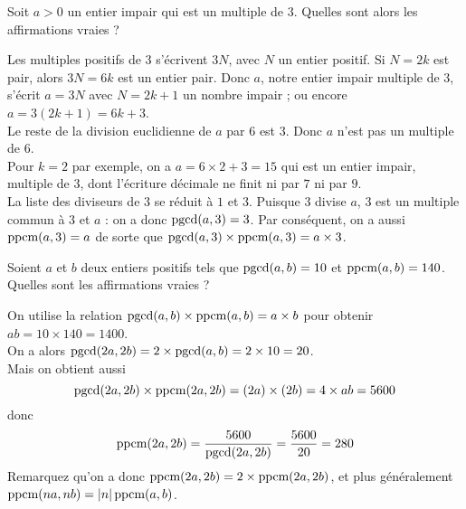 \begin{question}
    Soit $a>0$ un entier impair qui est un multiple de $3$. Quelles sont alors les affirmations vraies ?
    \begin{answers} 
    \end{answers}
    \begin{explanations} 
    Les multiples positifs de $3$ s'écrivent $3N$, avec $N$ un entier positif. Si $N=2k$ est pair, alors $3N = 6k$ est un entier pair. Donc $a$, notre entier impair multiple de $3$, s'écrit $a = 3N$ avec $N = 2k+1$ un nombre impair ; ou encore $a = 3(2k+1) = 6k + 3$.\\
    Le reste de la division euclidienne de $a$ par $6$ est $3$. Donc $a$ n'est pas un multiple de $6$.\\
    Pour $k=2$ par exemple, on a $a = 6 \times 2 + 3 = 15$ qui est un entier impair, multiple de $3$, dont l'écriture décimale ne finit ni par $7$ ni par $9$.\\
    La liste des diviseurs de $3$ se réduit à $1$ et $3$. Puisque $3$ divise $a$, $3$ est un multiple commun à $3$ et $a$ : on a donc $\mathop{\text{pgcd}}(a,3) = 3$. Par conséquent, on a aussi $\mathop{\text{ppcm}}(a,3) = a$ de sorte que $\mathop{\text{pgcd}}(a,3) \times \mathop{\text{ppcm}}(a,3) = a \times 3$.
    \end{explanations}
\end{question}



\begin{question}
    Soient $a$ et $b$ deux entiers positifs tels que $\mathop{\text{pgcd}}(a,b) = 10$ et $\mathop{\text{ppcm}}(a,b) = 140$. Quelles sont les affirmations vraies ?
    \begin{answers} 
    \end{answers}
    \begin{explanations} 
    On utilise la relation $\mathop{\text{pgcd}}(a,b) \times \mathop{\text{ppcm}}(a,b) = a \times b$ pour obtenir $ab = 10 \times 140 = 1400$.\\
    On a alors $\mathop{\text{pgcd}}(2a,2b) = 2 \times \mathop{\text{pgcd}}(a,b) = 2 \times 10 = 20$.\\
    Mais on obtient aussi 
    $$ \mathop{\text{pgcd}}(2a, 2b) \times \mathop{\text{ppcm}}(2a,2b) = (2a) \times (2b) = 4 \times ab = 5600$$
    donc 
    $$\mathop{\text{ppcm}}(2a,2b) = \frac{5600}{\mathop{\text{pgcd}}(2a,2b)} = \frac{5600}{20} = 280 $$
    Remarquez qu'on a donc $\mathop{\text{ppcm}}(2a,2b) = 2 \times \mathop{\text{ppcm}}(2a,2b)$, et plus généralement $\mathop{\text{ppcm}}(na,nb) = |n| \mathop{\text{ppcm}}(a,b)$.
    \end{explanations}
\end{question}




